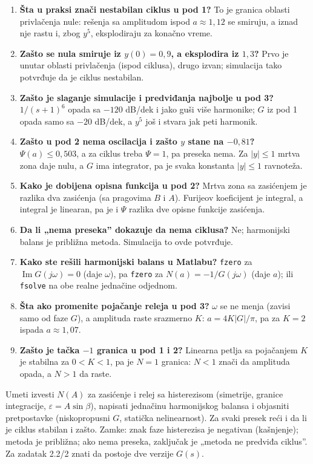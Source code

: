 \documentclass[11pt,a4paper,parskip=half,headsepline,numbers=noenddot]{scrartcl}
\begin{document}
\begin{enumerate}
\def\labelenumi{\arabic{enumi}.}
\item \textbf{Šta u praksi znači nestabilan ciklus u pod 1?} To je granica oblasti privlačenja nule: rešenja sa amplitudom ispod \(a \approx 1{,}12\) se smiruju, a iznad nje rastu i, zbog \(y^5\), eksplodiraju za konačno vreme.
\item \textbf{Zašto se nula smiruje iz \(y(0) = 0{,}9\), a eksplodira iz \(1{,}3\)?} Prvo je unutar oblasti privlačenja (ispod ciklusa), drugo izvan; simulacija tako potvrđuje da je ciklus nestabilan.
\item \textbf{Zašto je slaganje simulacije i predviđanja najbolje u pod 3?} \(1/(s+1)^6\) opada sa \(-120\) dB/dek i jako guši više harmonike; \(G\) iz pod 1 opada samo sa \(-20\) dB/dek, a \(y^5\) još i stvara jak peti harmonik.
\item \textbf{Zašto u pod 2 nema oscilacija i zašto \(y\) stane na \(-0{,}81\)?} \(\Psi(a) \le 0{,}503\), a za ciklus treba \(\Psi = 1\), pa preseka nema. Za \(|y| \le 1\) mrtva zona daje nulu, a \(G\) ima integrator, pa je svaka konstanta \(|y| \le 1\) ravnoteža.
\item \textbf{Kako je dobijena opisna funkcija u pod 2?} Mrtva zona sa zasićenjem je razlika dva zasićenja (sa pragovima \(B\) i \(A\)). Furijeov koeficijent je integral, a integral je linearan, pa je i \(\Psi\) razlika dve opisne funkcije zasićenja.
\item \textbf{Da li „nema preseka'' dokazuje da nema ciklusa?} Ne; harmonijski balans je približna metoda. Simulacija to ovde potvrđuje.
\item \textbf{Kako ste rešili harmonijski balans u Matlabu?} \texttt{fzero} za \(\operatorname{Im}G(j\omega) = 0\) (daje \(\omega\)), pa \texttt{fzero} za \(N(a) = -1/G(j\omega)\) (daje \(a\)); ili \texttt{fsolve} na obe realne jednačine odjednom.
\item \textbf{Šta ako promenite pojačanje releja u pod 3?} \(\omega\) se ne menja (zavisi samo od faze \(G\)), a amplituda raste srazmerno \(K\): \(a = 4K|G|/\pi\), pa za \(K = 2\) ispada \(a \approx 1{,}07\).
\item \textbf{Zašto je tačka \(-1\) granica u pod 1 i 2?} Linearna petlja sa pojačanjem \(K\) je stabilna za \(0 < K < 1\), pa je \(N = 1\) granica: \(N < 1\) znači da amplituda opada, a \(N > 1\) da raste.
\end{enumerate}

\begin{ispit}
Umeti izvesti \(N(A)\) za zasićenje i relej sa histerezisom (simetrije, granice integracije, \(\varepsilon = A\sin\beta\)), napisati jednačinu harmonijskog balansa i objasniti pretpostavke (niskopropusni \(G\), statička nelinearnost). Za svaki presek reći i da li je ciklus stabilan i zašto. Zamke: znak faze histerezisa je negativan (kašnjenje); metoda je približna; ako nema preseka, zaključak je „metoda ne predviđa ciklus''. Za zadatak 2.2/2 znati da postoje dve verzije \(G(s)\).
\end{ispit}
\end{document}
